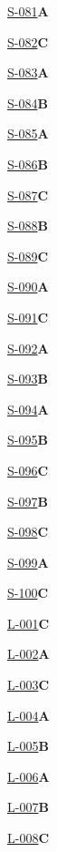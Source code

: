 \noindent\hyperref[q:S-081]{S-081}\hfill\textbf{A}\par
\noindent\hyperref[q:S-082]{S-082}\hfill\textbf{C}\par
\noindent\hyperref[q:S-083]{S-083}\hfill\textbf{A}\par
\noindent\hyperref[q:S-084]{S-084}\hfill\textbf{B}\par
\noindent\hyperref[q:S-085]{S-085}\hfill\textbf{A}\par
\noindent\hyperref[q:S-086]{S-086}\hfill\textbf{B}\par
\noindent\hyperref[q:S-087]{S-087}\hfill\textbf{C}\par
\noindent\hyperref[q:S-088]{S-088}\hfill\textbf{B}\par
\noindent\hyperref[q:S-089]{S-089}\hfill\textbf{C}\par
\noindent\hyperref[q:S-090]{S-090}\hfill\textbf{A}\par
\noindent\hyperref[q:S-091]{S-091}\hfill\textbf{C}\par
\noindent\hyperref[q:S-092]{S-092}\hfill\textbf{A}\par
\noindent\hyperref[q:S-093]{S-093}\hfill\textbf{B}\par
\noindent\hyperref[q:S-094]{S-094}\hfill\textbf{A}\par
\noindent\hyperref[q:S-095]{S-095}\hfill\textbf{B}\par
\noindent\hyperref[q:S-096]{S-096}\hfill\textbf{C}\par
\noindent\hyperref[q:S-097]{S-097}\hfill\textbf{B}\par
\noindent\hyperref[q:S-098]{S-098}\hfill\textbf{C}\par
\noindent\hyperref[q:S-099]{S-099}\hfill\textbf{A}\par
\noindent\hyperref[q:S-100]{S-100}\hfill\textbf{C}\par
\noindent\hyperref[q:L-001]{L-001}\hfill\textbf{C}\par
\noindent\hyperref[q:L-002]{L-002}\hfill\textbf{A}\par
\noindent\hyperref[q:L-003]{L-003}\hfill\textbf{C}\par
\noindent\hyperref[q:L-004]{L-004}\hfill\textbf{A}\par
\noindent\hyperref[q:L-005]{L-005}\hfill\textbf{B}\par
\noindent\hyperref[q:L-006]{L-006}\hfill\textbf{A}\par
\noindent\hyperref[q:L-007]{L-007}\hfill\textbf{B}\par
\noindent\hyperref[q:L-008]{L-008}\hfill\textbf{C}\par
